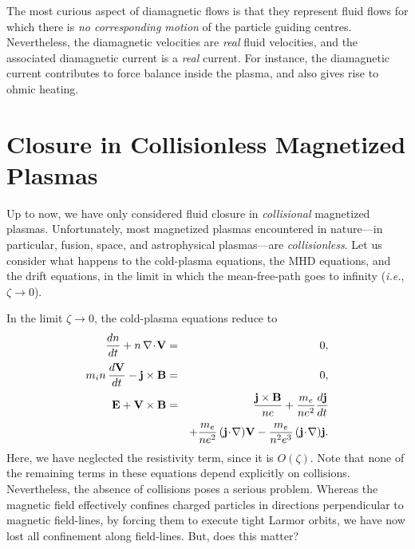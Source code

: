 The most curious aspect of  diamagnetic flows is that they represent fluid flows
for which there is {\em no corresponding motion}\/ of the particle guiding
centres. Nevertheless, the diamagnetic velocities are {\em real}\/ fluid
velocities, and the associated diamagnetic current is a {\em real}\/ current. 
For instance, the diamagnetic current contributes to force balance inside the plasma,
and also gives rise to ohmic heating. 

\section{Closure in Collisionless Magnetized Plasmas}\label{s3.13}
Up to now, we have only considered fluid closure in {\em collisional}\/  magnetized
plasmas.
Unfortunately, most magnetized plasmas encountered in nature---in particular,
fusion, space, and astrophysical plasmas---are {\em collisionless}. 
Let us consider what happens to the cold-plasma equations, the MHD equations,
and the drift equations, in the limit in which the mean-free-path goes
to infinity ({\em i.e.}, $\zeta\rightarrow 0$). 

In the limit $\zeta\rightarrow 0$, the cold-plasma equations reduce to
\begin{eqnarray}
\frac{dn}{dt} + n\,\nabla\!\cdot\!{\bf V} &=& 0,\label{e3.162a}\\[0.5ex]
m_i n\,\frac{d{\bf V}}{dt} -{\bf j}\times {\bf B}& =& 0,\\[0.5ex]
{\bf E} + {\bf V}\times {\bf B}& =& 
\frac{{\bf j}\times{\bf B}}
{ne} + \frac{m_e}{n e^2} \frac{d{\bf j}}{dt}\\[0.5ex]
 &&+ \frac{m_e}{ne^2}\, ({\bf j}\!\cdot\!\nabla){\bf V} - \frac{m_e}{n^2 e^3}\,
({\bf j}\!\cdot\!\nabla){\bf j}.\nonumber\label{e3.162c}
\end{eqnarray}
Here, we have neglected the resistivity term, since it is $O(\zeta)$. 
Note that none of the remaining terms in these equations depend 
explicitly on collisions. Nevertheless, the absence of collisions
poses a serious problem. Whereas the magnetic field effectively confines
charged particles in directions perpendicular to  magnetic field-lines,
by forcing them to execute tight Larmor orbits, we have now  lost all 
confinement along  field-lines. But, does this matter?
 
